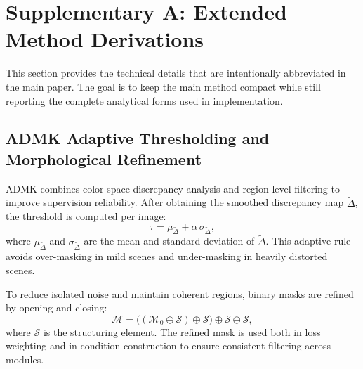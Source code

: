 
\section{Supplementary A: Extended Method Derivations}
\label{supp:extended_method}

This section provides the technical details that are intentionally abbreviated in the main paper. The goal is to keep the main method compact while still reporting the complete analytical forms used in implementation.

\subsection{ADMK Adaptive Thresholding and Morphological Refinement}
ADMK combines color-space discrepancy analysis and region-level filtering to improve supervision reliability. After obtaining the smoothed discrepancy map $\widetilde{\Delta}$, the threshold is computed per image:
\begin{equation}
\tau = \mu_{\widetilde{\Delta}} + \alpha\,\sigma_{\widetilde{\Delta}},
\label{eq:supp_admk_tau}
\end{equation}
where $\mu_{\widetilde{\Delta}}$ and $\sigma_{\widetilde{\Delta}}$ are the mean and standard deviation of $\widetilde{\Delta}$. This adaptive rule avoids over-masking in mild scenes and under-masking in heavily distorted scenes.

To reduce isolated noise and maintain coherent regions, binary masks are refined by opening and closing:
\begin{equation}
\mathcal{M} = \bigl((\mathcal{M}_0 \ominus \mathcal{S}) \oplus \mathcal{S}\bigr) \oplus \mathcal{S} \ominus \mathcal{S},
\label{eq:supp_admk_morph}
\end{equation}
where $\mathcal{S}$ is the structuring element. The refined mask is used both in loss weighting and in condition construction to ensure consistent filtering across modules.

